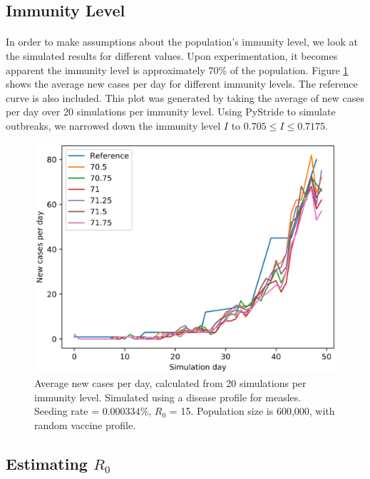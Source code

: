 \documentclass[runningheads]{llncs}
\begin{document}
\subsection{Immunity Level}

\paragraph{} In order to make assumptions about the population's immunity level, we look at the simulated results for different values. Upon experimentation, it becomes apparent the immunity level is approximately 70\% of the population. Figure \ref{immLvlPlot} shows the average new cases per day for different immunity levels. The reference curve is also included. This plot was generated by taking the average of new cases per day over 20 simulations per immunity level. Using PyStride to simulate outbreaks, we narrowed down the immunity level $I$ to \( 0.705 \leq I \leq 0.7175 \).

\begin{figure}[H]
	\centering
	\includegraphics[width=\textwidth]{ImmLvl.eps}
	\caption{Average new cases per day, calculated from 20 simulations per immunity level. Simulated using a disease profile for measles. Seeding rate = $0.000334$\%, $R_0$ = 15. Population size is 600,000, with random vaccine profile.} 
	\label{immLvlPlot}
\end{figure}


\subsection{Estimating $R_{0}$}
\end{document}
